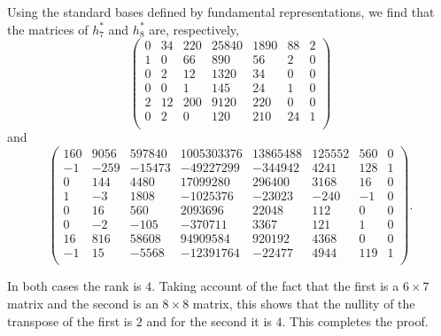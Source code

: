 \documentclass[twoside,a4paper,reqno,11pt]{amsart}
\begin{document}
Using the standard bases defined by fundamental representations, we find that the matrices of $h_7^*$ and $h_8^*$ are, respectively,  
\[ \begin{pmatrix}   
    0&   34&  220&25840& 1890&   88&    2\\
    1&    0&   66&  890&   56&    2&    0\\
    0&    2&   12& 1320&   34&    0&    0\\
    0&    0&    1&  145&   24&    1&    0\\
    2&   12&  200& 9120&  220&    0&    0\\
    0&    2&    0&  120&  210&   24&    1\\
\end{pmatrix}\]
and
\[
\begin{pmatrix}
       160&      9056&    597840&1005303376&  13865488&    125552&       560&         0\\
        -1&      -259&    -15473& -49227299&   -344942&      4241&       128&         1\\
         0&       144&      4480&  17099280&    296400&      3168&        16&         0\\
         1&        -3&      1808&  -1025376&    -23023&      -240&        -1&         0\\
         0&        16&       560&   2093696&     22048&       112&         0&         0\\
         0&        -2&      -105&   -370711&      3367&       121&         1&         0\\
        16&       816&     58608&  94909584&    920192&      4368&         0&         0\\
        -1&        15&     -5568& -12391764&    -22477&      4944&       119&         1\\

\end{pmatrix}.\]

In both cases the rank is $4$.  Taking account of the fact that the first is a $6 \times 7$ matrix and the second is an $8 \times 8$ matrix, this shows that the nullity of the transpose of the first is $2$ and for the second it is $4$. This completes the proof.   



\end{document}
